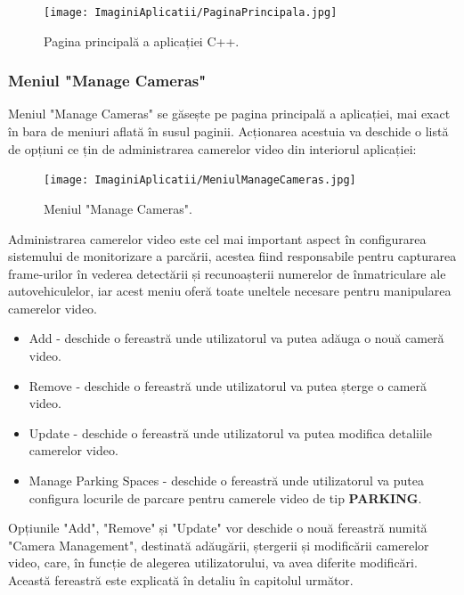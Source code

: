 \documentclass[12pt]{article}
\begin{document}

\begin{figure}[H]
  \centering
  \texttt{[image: ImaginiAplicatii/PaginaPrincipala.jpg]}
  \caption{Pagina principal\u{a} a aplicației C++.}
  \label{fig:aplicatie_pagina_principala}
\end{figure}

\subsubsection{Meniul "Manage Cameras"}

Meniul "Manage Cameras" se g\u{a}sește pe pagina principal\u{a} a aplicației, mai exact \^{i}n bara de meniuri aflat\u{a} \^{i}n susul paginii. Acționarea acestuia va deschide o list\u{a} de opțiuni ce țin de administrarea camerelor video din interiorul aplicației:

\begin{figure}[H]
  \centering
  \texttt{[image: ImaginiAplicatii/MeniulManageCameras.jpg]}
  \caption{Meniul "Manage Cameras".}
  \label{fig:aplicatie_meniul_manage_cameras}
\end{figure}

Administrarea camerelor video este cel mai important aspect \^{i}n configurarea sistemului de monitorizare a parc\u{a}rii, acestea fiind responsabile pentru capturarea frame-urilor \^{i}n vederea detect\u{a}rii și recunoașterii numerelor de \^{i}nmatriculare ale autovehiculelor, iar acest meniu ofer\u{a} toate uneltele necesare pentru manipularea camerelor video.

\begin{itemize}
    \item Add - deschide o fereastr\u{a} unde utilizatorul va putea ad\u{a}uga o nou\u{a} camer\u{a} video.
    \item Remove - deschide o fereastr\u{a} unde utilizatorul va putea șterge o camer\u{a} video.
    \item Update - deschide o fereastr\u{a} unde utilizatorul va putea modifica detaliile camerelor video.
    \item Manage Parking Spaces - deschide o fereastr\u{a} unde utilizatorul va putea configura locurile de parcare pentru camerele video de tip \textbf{PARKING}.
\end{itemize}

Opțiunile "Add", "Remove" și "Update" vor deschide o nou\u{a} fereastr\u{a} numit\u{a} "Camera Management", destinat\u{a} ad\u{a}ug\u{a}rii, ștergerii și modific\u{a}rii camerelor video, care, \^{i}n funcție de alegerea utilizatorului, va avea diferite modific\u{a}ri. Aceast\u{a} fereastr\u{a} este explicat\u{a} \^{i}n detaliu \^{i}n capitolul urm\u{a}tor.
\end{document}
